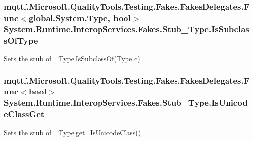\hypertarget{class_system_1_1_runtime_1_1_interop_services_1_1_fakes_1_1_stub___type_a6c02eac4c152f6ea39f9421d003b359b}{
\subsubsection[{Is\-Subclass\-Of\-Type}]{\setlength{\rightskip}{0pt plus 5cm}mqttf.\-Microsoft.\-Quality\-Tools.\-Testing.\-Fakes.\-Fakes\-Delegates.\-Func$<$global.\-System.\-Type, bool$>$ System.\-Runtime.\-Interop\-Services.\-Fakes.\-Stub\-\_\-\-Type.\-Is\-Subclass\-Of\-Type}}\label{class_system_1_1_runtime_1_1_interop_services_1_1_fakes_1_1_stub___type_a6c02eac4c152f6ea39f9421d003b359b}


Sets the stub of \-\_\-\-Type.\-Is\-Subclass\-Of(\-Type c)

\hypertarget{class_system_1_1_runtime_1_1_interop_services_1_1_fakes_1_1_stub___type_acc3e48366a6c6469e9736c630666c2f0}{
\subsubsection[{Is\-Unicode\-Class\-Get}]{\setlength{\rightskip}{0pt plus 5cm}mqttf.\-Microsoft.\-Quality\-Tools.\-Testing.\-Fakes.\-Fakes\-Delegates.\-Func$<$bool$>$ System.\-Runtime.\-Interop\-Services.\-Fakes.\-Stub\-\_\-\-Type.\-Is\-Unicode\-Class\-Get}}\label{class_system_1_1_runtime_1_1_interop_services_1_1_fakes_1_1_stub___type_acc3e48366a6c6469e9736c630666c2f0}


Sets the stub of \-\_\-\-Type.\-get\-\_\-\-Is\-Unicode\-Class()

